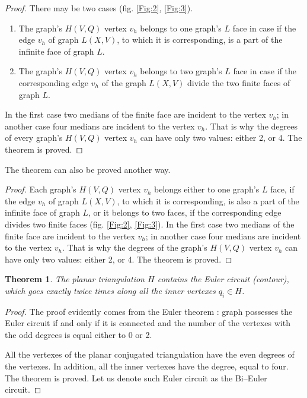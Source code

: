 \documentclass{amsart}
\newtheorem{theorem}{Theorem}
\theoremstyle{plain}
\numberwithin{equation}{section}
\begin{document}
\begin {proof}
There may be two cases (fig. \ref{Fig:2}, \ref{Fig:3}).
\begin{enumerate}
\item	
The graph's $H(V,Q)$ vertex $v_h$ belongs to one graph's $L$ face in case if the edge $v_h$ of graph $L(X,V)$, to which it is corresponding, is a part of the infinite face of graph $L$.
\item	
The graph's $H(V,Q)$ vertex $v_h$ belongs to two graph's $L$ face in case if the corresponding edge $v_h$ of the graph $L(X,V)$ divide the two finite faces of graph $L$.
\end{enumerate}
	
In the first case two medians of the finite face are incident to the vertex $v_h$; in another case four medians are incident to the vertex $v_h$. That is why the degrees of every graph's $H(V,Q)$ vertex $v_h$ can have only two values: either 2, or 4. The theorem is proved.
\end {proof}

The theorem can also be proved another way.

\begin {proof}
Each graph's $H(V,Q)$ vertex $v_h$ belongs either to one graph's $L$ face, if the edge $v_h$ of graph $L(X,V)$, to which it is corresponding, is also a part of the infinite face of graph $L$, or it belongs to two faces, if the corresponding edge divides two finite faces (fig. \ref{Fig:2}, \ref{Fig:3}). In the first case two medians of the finite face are incident to the vertex $v_h$; in another case four medians are incident to the vertex $v_h$. That is why the degrees of the graph's $H(V,Q)$ vertex $v_h$ can have only two values: either 2, or 4. The theorem is proved.
\end {proof}

\begin{theorem}
The planar triangulation $H$ contains the Euler circuit (contour), which goes exactly twice times along all the inner vertexes $q_i \in H$.
\end {theorem}

\begin {proof}
The proof evidently comes from the Euler theorem \cite {Berge}: graph possesses the Euler circuit if and only if it is connected and the number of the vertexes with the odd degrees is equal either to 0 or 2. 

All the vertexes of the planar conjugated triangulation have the even degrees of the vertexes. In addition, all the inner vertexes have the degree, equal to four. The theorem is proved. Let us denote such Euler circuit as the Bi--Euler circuit.
\end {proof}
\end{document}
